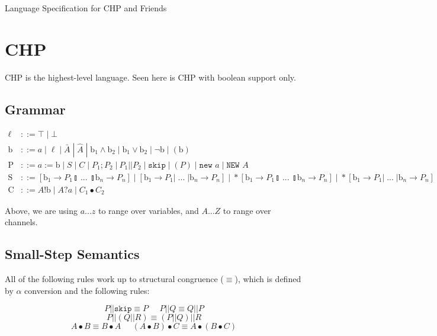 \documentclass[times,10pt]{article}
\begin{document}
\begin{center}
\Large Language Specification for CHP and Friends
\end{center}

\section{CHP}

CHP is the highest-level language.  Seen here is CHP with boolean support only.

\subsection{Grammar}

\begin{align*}
\ell & ::= \top \; | \perp \\
\mathrm{b} & ::= a \; | \; \ell \; | \; \bar{A} \; | \; \widehat{A} \; | \; \mathrm{b}_1 \wedge \mathrm{b}_2 \; | \; \mathrm{b}_1 \vee \mathrm{b}_2 \; | \; \lnot \mathrm{b} \; | \; (\mathrm{b}) \\
\mathrm{P} & ::= a := \mathrm{b} \; | \; S \; | \; C \; | \; P_1; P_2 \; | \: P_1 || P_2 \; | \; \mathtt{skip} \; | \; (P) \; | \; \texttt{new } a \; | \; \texttt{NEW } A\\
\mathrm{S} & ::= [ \mathrm{b}_1 \rightarrow P_1  \talloblong \; ... \; \talloblong \mathrm{b}_n \rightarrow P_n ] \; | \; [ \mathrm{b}_1 \rightarrow P_1 | \; ... \; | \mathrm{b}_n \rightarrow P_n ] \; | \; *[ \mathrm{b}_1 \rightarrow P_1  \talloblong \; ... \; \talloblong \mathrm{b}_n \rightarrow P_n ] \; | \; *[ \mathrm{b}_1 \rightarrow P_1 | \; ... \; | \mathrm{b}_n \rightarrow P_n ] \\
\mathrm{C} & ::= A!\mathrm{b} \; | \; A?a \; | \; C_1 \bullet C_2
\end{align*}

Above, we are using $a ... z$ to range over variables, and $A ... Z$ to range over channels.

\subsection{Small-Step Semantics}

All of the following rules work up to structural congruence ($\equiv$), which is defined by $\alpha$ conversion and the following rules:

\[
P || \mathtt{skip} \equiv P \;\;\;\;\;  P || Q \equiv Q || P %
\]
\[
P || (Q || R) \equiv (P || Q) || R 
\]
\[
A \bullet B \equiv B \bullet A \;\;\;\;\; ( A \bullet B ) \bullet C \equiv A \bullet ( B \bullet C )
\]
\end{document}
